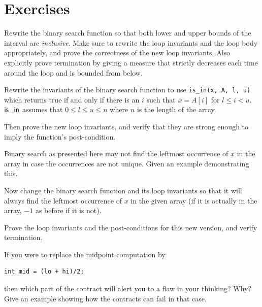\clearpage
\section{Exercises}

\begin{exercise}
  \label{exc:binsearch-inclusive} Rewrite the binary search function so
  that both lower and upper bounds of the interval are
  \emph{inclusive}.  Make sure to rewrite the loop invariants and the
  loop body appropriately, and prove the correctness of the new
  loop invariants.  Also explicitly prove termination by giving a
  measure that strictly decreases each time around the loop and is
  bounded from below.
\end{exercise}

\begin{exercise}
  \label{exc:binsearch-isin}
  Rewrite the invariants of the binary
  search function to use \lstinline'is_in(x, A, l, u)' which returns true
  if and only if there is an $i$ such that $x = A[i]$ for $l \leq i <
  u$.  $\mathsf{is\_in}$ assumes that $0 \leq l \leq u \leq n$ where $n$ is
  the length of the array.

  Then prove the new loop invariants, and verify that they are strong
  enough to imply the function's post-condition.
\end{exercise}

\begin{exercise}
  Binary search as presented here may not find the leftmost
  occurrence of $x$ in the array in case the occurrences are
  not unique.  Given an example demonstrating this.

  Now change the binary search function and its loop invariants so
  that it will always find the leftmost occurrence of $x$ in the given
  array (if it is actually in the array, $-1$ as before if it is not).

  Prove the loop invariants and the post-conditions for this new
  version, and verify termination.
\end{exercise}

\begin{exercise}
  If you were to replace the midpoint computation by
\begin{lstlisting}[language={[C0]C}]
int mid = (lo + hi)/2;
\end{lstlisting}
  then which part of the contract will alert you to a flaw in your thinking?
  Why? Give an example showing how the contracts can fail in that case.
\end{exercise}

